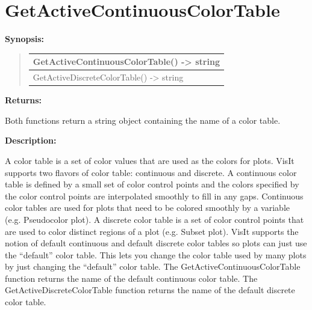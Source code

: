 \documentclass[letterpaper,10pt,english]{sphinxmanual}
\begin{document}
\section{GetActiveContinuousColorTable}
\label{functions:getactivecontinuouscolortable}
\begin{DUlineblock}{0em}
\item[] \textbf{Synopsis:}
\end{DUlineblock}
\begin{quote}

\begin{tabulary}{\linewidth}{|L|}
\hline

GetActiveContinuousColorTable() -\textgreater{} string
\\
\hline
GetActiveDiscreteColorTable() -\textgreater{} string
\\
\hline\end{tabulary}

\end{quote}

\begin{DUlineblock}{0em}
\item[] 
\item[] \textbf{Returns:}
\item[] Both functions return a string object containing the name of a color table.
\item[] 
\item[] \textbf{Description:}
\item[] A color table is a set of color values that are used as the colors for
plots. VisIt supports two flavors of color table: continuous and discrete.
A continuous color table is defined by a small set of color control points
and the colors specified by the color control points are interpolated
smoothly to fill in any gaps. Continuous color tables are used for plots
that need to be colored smoothly by a variable (e.g. Pseudocolor plot). A
discrete color table is a set of color control points that are used to
color distinct regions of a plot (e.g. Subset plot). VisIt supports the
notion of default continuous and default discrete color tables so plots can
just use the ``default'' color table. This lets you change the color table
used by many plots by just changing the ``default'' color table. The
GetActiveContinuousColorTable function returns the name of the default
continuous color table. The GetActiveDiscreteColorTable function returns
the name of the default discrete color table.
\end{DUlineblock}
\end{document}
